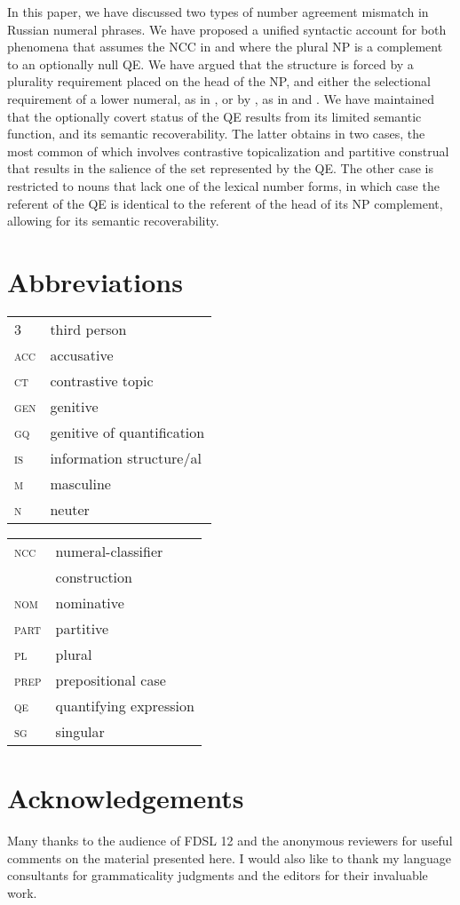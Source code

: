 \documentclass[output=paper,
modfonts,
newtxmath,
hidelinks
]{langscibook}
\begin{document}
In this paper, we have discussed two types of number agreement mismatch in Russian numeral phrases. We have proposed a unified syntactic account for both phenomena that assumes the NCC in  and  where the plural NP is a complement to an optionally null QE. We have argued that the structure is forced by a plurality requirement placed on the head of the NP, and either the selectional requirement of a lower numeral, as in , or by , as in  and . We have maintained that the optionally covert status of the QE results from its limited semantic function, and its semantic recoverability. The latter obtains in two cases, the most common of which involves contrastive topicalization and partitive construal that results in the salience of the set represented by the QE. The other case is restricted to nouns that lack one of the lexical number forms, in which case the referent of the QE is identical to the referent of the head of its NP complement, allowing for its semantic recoverability. 


\section*{Abbreviations}

\begin{tabularx}{.5\textwidth}{@{}lQ@{}}
\textsc{3}&third person\\
\textsc{acc}&accusative\\
\textsc{ct}&contrastive topic\\
\textsc{gen}&genitive\\
\textsc{gq}&genitive of quantification\\
\textsc{is}&information structure/al\\
\textsc{m}&masculine\\
\textsc{n}&neuter\\
\end{tabularx}%
\begin{tabularx}{.5\textwidth}{@{}lQ@{}}
\textsc{ncc}&numeral-classifier\\
&construction\\
\textsc{nom}&nominative\\
\textsc{part}&partitive\\
\textsc{pl}&plural\\
\textsc{prep}&prepositional case\\
\textsc{qe}&quantifying expression\\
\textsc{sg}&singular\\
\end{tabularx}

\section*{Acknowledgements}

Many thanks to the audience of FDSL 12 and the anonymous reviewers for useful comments on the material presented here. I would also like to thank my language consultants for grammaticality judgments and the editors for their invaluable work.

\sloppy
\printbibliography[heading=subbibliography,notkeyword=this]
\end{document}
